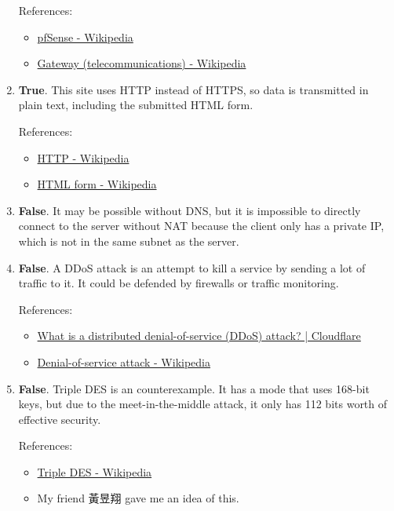 \documentclass[12pt, a4paper]{article}
\begin{document}
\begin{enumerate}
      References:
      \begin{itemize}
        \item \href{https://en.wikipedia.org/wiki/PfSense}{pfSense - Wikipedia}
        \item \href{https://en.wikipedia.org/wiki/Gateway_(telecommunications)}{Gateway (telecommunications) - Wikipedia}
      \end{itemize}

    \item \textbf{True}. This site uses HTTP instead of HTTPS, so data is
      transmitted in plain text, including the submitted HTML form.

      References:
      \begin{itemize}
        \item \href{https://en.wikipedia.org/wiki/HTTP}{HTTP - Wikipedia}
        \item \href{https://en.wikipedia.org/wiki/HTML_form}{HTML form - Wikipedia}
      \end{itemize}

    \item \textbf{False}. It may be possible without DNS, but it is impossible
      to directly connect to the server without NAT because the client only
      has a private IP, which is not in the same subnet as the server.

    \item \textbf{False}. A DDoS attack is an attempt to kill a service by
      sending a lot of traffic to it. It could be defended by firewalls or
      traffic monitoring.

      References:
      \begin{itemize}
        \item \href{https://www.cloudflare.com/learning/ddos/what-is-a-ddos-attack/}{What is a distributed denial-of-service (DDoS) attack? | Cloudflare}
        \item \href{https://en.wikipedia.org/wiki/Denial-of-service_attack}{Denial-of-service attack - Wikipedia}
      \end{itemize}

    \item \textbf{False}. Triple DES is an counterexample. It has a mode
      that uses 168-bit keys, but due to the meet-in-the-middle attack,
      it only has 112 bits worth of effective security.

      References:
      \begin{itemize}
        \item \href{https://en.wikipedia.org/wiki/Triple_DES}{Triple DES - Wikipedia}
        \item My friend 黃昱翔 gave me an idea of this.
      \end{itemize}
  \end{enumerate}
\end{document}
